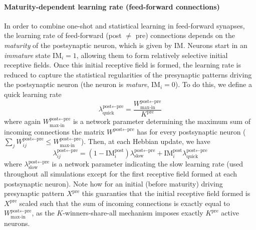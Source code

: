 \documentclass{article}
\begin{document}
\paragraph*{Maturity-dependent learning rate (feed-forward connections)}
In order to combine one-shot and statistical learning in feed-forward synapses, the learning rate of feed-forward (post $\neq$ pre) connections depends on the \textit{maturity} of the postsynaptic neuron, which is given by $\textrm{IM}$. Neurons start in an \textit{immature} state $\textrm{IM}_i = 1$, allowing them to form relatively selective initial receptive fields. Once this initial receptive field is formed, the learning rate is reduced to capture the statistical regularities of the presynaptic patterns driving the postsynaptic neuron (the neuron is \textit{mature}, $\textrm{IM}_i = 0$). To do this, we define a quick learning rate
\begin{equation}
        \lambda^{\textrm{post}\leftarrow\textrm{pre}}_\textrm{quick} = \frac{W^{\textrm{post}\leftarrow\textrm{pre}}_\textrm{max-in}}{K^\textrm{pre}} 
\end{equation}
where again $W^{\textrm{post}\leftarrow\textrm{pre}}_\textrm{max-in}$ is a network parameter determining the maximum sum of incoming connections the matrix $W^{\textrm{post}\leftarrow\textrm{pre}}$ has for every postsynaptic neuron ($\sum_jW^{\textrm{post}\leftarrow\textrm{pre}}_{ij} \leq W^{\textrm{post}\leftarrow\textrm{pre}}_\textrm{max-in}$). Then, at each Hebbian update, we have
\begin{equation}
    \lambda_{ij}^{\textrm{post} \leftarrow \textrm{pre}} = (1 - \textrm{IM}^\textrm{post}_i)\lambda^{\textrm{post} \leftarrow \textrm{pre}}_\textrm{slow} + \textrm{IM}^\textrm{post}_i\lambda^{\textrm{post}\leftarrow\textrm{pre}}_\textrm{quick}
\end{equation}
where $\lambda^{\textrm{post} \leftarrow \textrm{pre}}_\textrm{slow}$ is a network parameter indicating the slow learning rate (used throughout all simulations except for the first receptive field formed at each postsynaptic neuron). Note how for an initial (before maturity) driving presynaptic pattern $X^\textrm{pre}$ this guaranties that the initial receptive field formed is $X^\textrm{pre}$ scaled such that the sum of incoming connections is exactly equal to $W^{\textrm{post}\leftarrow\textrm{pre}}_\textrm{max-in}$, as the $K$-winners-share-all mechanism imposes exactly $K^\textrm{pre}$ active neurons.
\end{document}
